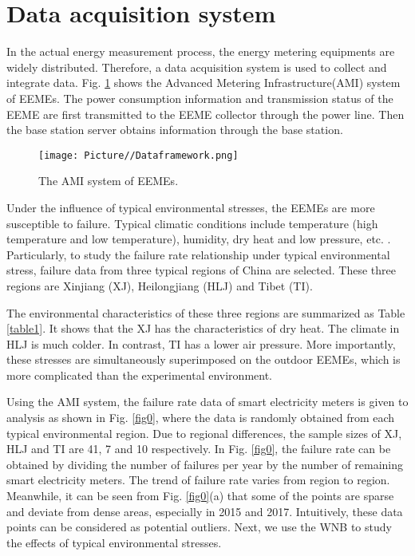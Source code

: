 \documentclass[journal,twoside,web]{ieeecolor}
\begin{document}
\section{Data acquisition system}
\label{Section1:data}
In the actual energy measurement process, the energy metering equipments are widely distributed. Therefore, a data acquisition system is used to collect and integrate data. Fig. \ref{fig1} shows the Advanced Metering Infrastructure(AMI) system of EEMEs. The power consumption information and transmission status of the EEME are first transmitted to the EEME collector through the power line. Then the base station server obtains information through the base station.

\begin{figure}
	\centerline{\texttt{[image: Picture//Dataframework.png]}}
	\caption{The AMI system of EEMEs.}
	\label{fig1}
\end{figure}

Under the influence of typical environmental stresses, the EEMEs are more susceptible to failure. Typical climatic conditions include  temperature (high temperature and low temperature), humidity, dry heat and low pressure, etc. \cite{IEC2003}. Particularly, to study the failure rate relationship under typical environmental stress, failure data from three typical regions of China are selected. These three regions are Xinjiang (XJ), Heilongjiang (HLJ) and Tibet (TI). 

The environmental characteristics of these three regions are summarized as Table \ref{table1}. It shows that the XJ has the characteristics of dry heat. The  climate in HLJ is much colder. In contrast, TI has a lower air pressure. More importantly, these stresses are simultaneously superimposed on the outdoor EEMEs, which is more complicated than the experimental environment.

Using the AMI system, the failure rate data of smart electricity meters is given to analysis as shown in Fig. \ref{fig0}, where the data is randomly obtained from each typical environmental region. Due to regional differences, the sample sizes of XJ, HLJ and TI are 41, 7 and 10 respectively. In Fig. \ref{fig0}, the failure rate can be obtained by dividing the number of failures per year by the number of remaining smart electricity meters. 
The trend of failure rate varies from region to region. Meanwhile, it can be seen from Fig. \ref{fig0}(a)  that some of the points are sparse and deviate from dense areas, especially in 2015 and 2017. Intuitively, these data points can be considered as potential outliers.
Next, we use the WNB to study the effects of typical environmental stresses.
\end{document}
